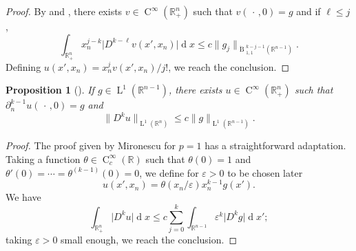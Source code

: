 \documentclass[a4paper,10pt]{amsart}
\newcommand{\R}{\mathbb R}
\renewcommand{\leq}{\leqslant}
\newcommand{\dif}{\mathrm{d}}
\renewcommand{\dif}{\operatorname{d}\!}
\newcommand{\lebe}{\operatorname{L}}
\newcommand{\hold}{\operatorname{C}}
\newcommand{\besov}{\operatorname{B}}
\numberwithin{equation}{section}
\newtheorem{proposition}[theorem]{Proposition}
\theoremstyle{remark}
\numberwithin{equation}{section}
\begin{document}
	\begin{proof}
		By \cite{Uspenskii} and \cite[Thm.~1.2]{MR}, there exists \(v \in \hold^\infty (\R^n_+)\) such that \(v (\,\cdot\,, 0) = g\) and if \(\ell \leq j \),
		\begin{equation*}
			\int_{\R^n_+} x_n^{j - k} \vert D^{k - \ell} v (x', x_n)\vert \dif x
			\leq c \lVert g_j \rVert_{\dot{\besov}{^{k-j - 1}_{1,1}}(\R^{n - 1})}. 
		\end{equation*}
		Defining \(u (x',x_n) = x_n^j v (x', x_n)/j!\), we reach the conclusion. 
	\end{proof}
	
	\begin{proposition}[{\cite[Lem. 3.3]{PW1}}]
		\label{proposition_extension_lebe}
		If \(g \in \lebe^1 (\R^{n - 1})\), there exists \(u \in \hold^\infty (\R^n_+)\) such that \(\partial_n^{k - 1} u (\,\cdot\,, 0) = g\) and 
		\begin{equation*}
			\lVert D^k u \rVert_{\lebe^1 (\R^n)}
			\leq c\lVert g \rVert_{\lebe^1 (\R^{n - 1})}. 
		\end{equation*}
	\end{proposition}
	\begin{proof}
		The proof given by Mironescu \cite{Mironescu_2015} for \(p = 1\) has a straightforward adaptation. 
		Taking a function \(\theta \in \hold^\infty_c(\R)\) such that \(\theta (0) = 1\) and \(\theta '(0) = \dotsb = \theta^{(k - 1)} (0) = 0\), we define for $\varepsilon>0$ to be chosen later
		\begin{equation*}
			u (x', x_n) = \theta (x_n/\varepsilon) x_n^{k- 1} g (x').
		\end{equation*}
		We have 
		\begin{equation*}
			\int_{\R^n_+} \vert D^k u \vert \dif x
			\leq c \sum_{j = 0}^k \int_{\R^{n - 1}} \varepsilon^k \vert D^k g \vert\dif x';
		\end{equation*}
		taking \(\varepsilon > 0\) small enough, we reach the conclusion.
	\end{proof}
	
\end{document}
